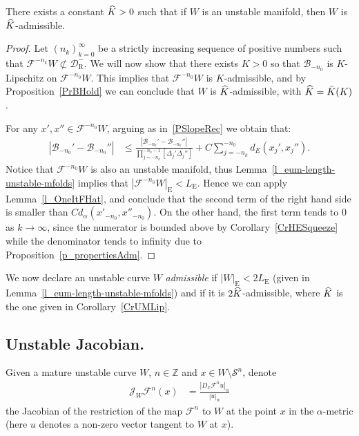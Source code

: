 \documentclass[AHL, Unicode, longabstracts,published]{cedram}
\newcommand{\integers}{\mathbb{Z}}
\newcommand{\cB}{\mathcal{B}}
\newcommand{\cm}{\mathcal{F}}
\newcommand{\cell}{\mathcal{D}}
\newcommand{\recoPrivate}{\mathrm{R}}
\newcommand{\reco}{{\cell^-_{\recoPrivate}}}
\newcommand{\eum}{_\text{E}}
\newcommand{\singPrivate}{\mathcal{S}}
\newcommand{\sing}[1]{\singPrivate^{#1}}
\newcommand{\admiss}{admissible}
\newcommand{\adm}{_{\alpha^{+}}}
\newcommand{\admName}{\alpha^{+}}
\newcommand{\jac}[1]{\mathcal{J}_{#1}}
\newcommand{\jacW}{\jac{W}}
\renewcommand{\admName}{\alpha}
\renewcommand{\adm}{_{\alpha}}
\let\oldhat\hat
\renewcommand*{\hat}[1]{\mathchoice{\widehat{#1}}{\widehat{#1}}{\oldhat{#1}}{\oldhat{#1}}}
\begin{document}
\begin{coro} \label{CrUMLip}
There exists a constant $\hat K > 0$ such that if $W$ is an unstable manifold, then $W$ is $\hat K$-\admiss{}.
\end{coro}
\begin{proof}
Let $(n_k)_{k = 0}^{\infty}$ be a strictly increasing sequence of positive numbers such that $\cm^{-n_k} W\not\subset \reco$. We will now show that there exists $K > 0$ so that $\cB_{-n_{0}}$ is $K$-Lipschitz on $\cm^{-n_{0}}W$. This implies that $\cm^{-n_{0}}W$ is $K$-admissible, and by Proposition~\ref{PrBHold} we can conclude that $W$ is $\hat K$-\admiss{}, with $\hat K = \bar K(K)$.

For any $x',x''\in \cm^{-n_{0}}W$, arguing as in~\eqref{PSlopeRec} we obtain that:
\begin{align}\label{SlopeBack}
|\cB_{-n_{0}}'-\cB_{-n_0}''| &\leq
\frac{|\cB_{-n_k}'-\cB_{-n_k}''|}{\prod_{j=-n_k}^{-n_{0}-1}
\left[\Delta_j' \Delta_j''\right]} +C \sum_{j=-n_k}^{-n_{0}} d_E\left(x_j', x_j''\right).
\end{align}
Notice that $\cm^{-n_{0}}W$ is also an unstable manifold, thus Lemma~\ref{l_eum-length-unstable-mfolds} implies that $|\cm^{-n_{0}}W|\eum < L\eum$. Hence we can apply Lemma~\ref{l_OneItFHat}, and conclude that the second term of the right hand side is smaller than $C d_\alpha(x'_{-n_{0}}, x''_{-n_{0}})$. On the other hand, the first term tends to $0$ as $k\to\infty$, since the numerator is bounded above by Corollary~\ref{CrHESqueeze} while the denominator tends to infinity due to Proposition~\ref{p_propertiesAdm}.
\end{proof}

We now declare an unstable curve $W$ \emph{\admiss{}} if $|W|\eum < 2L\eum$ (given in Lem\-ma~\ref{l_eum-length-unstable-mfolds}) and if it is $2\hat K$-admissible, where $\hat K$ is the one given in Corollary~\ref{CrUMLip}. 
\subsection{Unstable Jacobian.} Given a mature unstable curve $W$, $n\in\integers$ and $x\in W\setminus\sing n$, denote
\begin{align*}
\jacW \cm^{n}(x) &= \frac{|D_{x}\cm^{n}u|\adm}{|u|\adm}
\end{align*}
the Jacobian of the restriction of the map $\cm^{n}$ to $W$ at the point $x$ in the $\admName$-metric (here $u$ denotes a non-zero vector tangent to $W$ at $x$).
\end{document}
